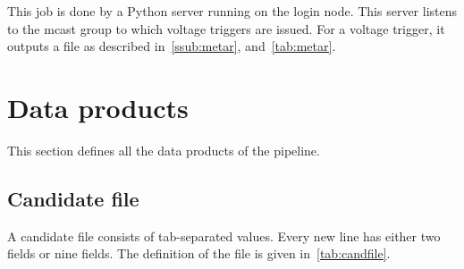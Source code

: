 \par This job is done by a Python server running on the login node. 
This server listens to the mcast group to which voltage triggers are issued.
For a voltage trigger, it outputs a  file as described in~\autoref{ssub:metar}, and~\autoref{tab:metar}.

\section {Data products}
\label{sec:datap}
\par This section defines all the data products of the pipeline. 
\subsection {Candidate file}
\label{ssub:candfile}
\par A candidate file consists of tab-separated values. Every new line has either two fields or nine fields. 
The definition of the file is given in~\autoref{tab:candfile}.
